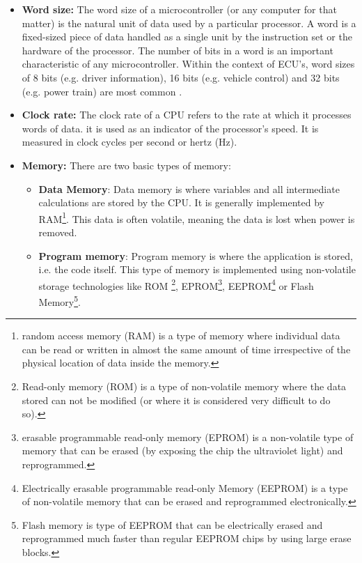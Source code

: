 \begin{itemize}
	\item \textbf{Word size:} The word size of a microcontroller (or any computer for that matter) is the natural unit of data used by a particular processor. A word is a fixed-sized piece of data handled as a single unit by the instruction set or the hardware of the processor. The number of bits in a word is an important characteristic of any microcontroller. Within the context of ECU's, word sizes of 8 bits (e.g. driver information), 16 bits (e.g. vehicle control) and 32 bits (e.g. power train) are most common \cite{ECU}.
	
	\item \textbf{Clock rate:} The clock rate of a CPU refers to the rate at which it processes words of data. it is used as an indicator of the processor's speed. It is measured in clock cycles per second or hertz (Hz). 
	
	\item \textbf{Memory:} There are two basic types of memory: 
	\begin{itemize}
		\item \textbf{Data Memory}: Data memory is where variables and all intermediate calculations are stored by the CPU. It is generally implemented by RAM\footnote{random access memory (RAM) is a type of memory where individual data can be read or written in almost the same amount of time irrespective of the physical location of data inside the memory.}. This data is often volatile, meaning the data is lost when power is removed.
		
		\item \textbf{Program memory}: Program memory is where the application is stored, i.e. the code itself. This type of memory is implemented using non-volatile storage technologies like ROM \footnote{Read-only memory (ROM) is a type of non-volatile memory where the data stored can not be modified (or where it is considered very difficult to do so).}, EPROM\footnote{erasable programmable read-only memory (EPROM) is a non-volatile type of memory that can be erased (by exposing the chip the ultraviolet light) and reprogrammed.}, EEPROM\footnote{Electrically erasable programmable read-only Memory (EEPROM) is a type of non-volatile memory that can be erased and reprogrammed electronically.} or Flash Memory\footnote{Flash memory is type of EEPROM  that can be electrically erased and reprogrammed much faster than regular EEPROM chips by using large erase blocks.}.
	\end{itemize}
	

\end{itemize}
